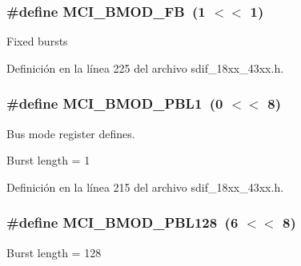 \subsubsection[{\texorpdfstring{M\+C\+I\+\_\+\+B\+M\+O\+D\+\_\+\+FB}{MCI_BMOD_FB}}]{\setlength{\rightskip}{0pt plus 5cm}\#define M\+C\+I\+\_\+\+B\+M\+O\+D\+\_\+\+FB~(1 $<$$<$ 1)}\hypertarget{group___s_d_i_f__18_x_x__43_x_x_ga86050ce8a0804c96d824fcc8d67ec905}{}\label{group___s_d_i_f__18_x_x__43_x_x_ga86050ce8a0804c96d824fcc8d67ec905}
Fixed bursts 

Definición en la línea 225 del archivo sdif\+\_\+18xx\+\_\+43xx.\+h.

\subsubsection[{\texorpdfstring{M\+C\+I\+\_\+\+B\+M\+O\+D\+\_\+\+P\+B\+L1}{MCI_BMOD_PBL1}}]{\setlength{\rightskip}{0pt plus 5cm}\#define M\+C\+I\+\_\+\+B\+M\+O\+D\+\_\+\+P\+B\+L1~(0 $<$$<$ 8)}\hypertarget{group___s_d_i_f__18_x_x__43_x_x_ga0813b6b5ee7658b090403123e5444a25}{}\label{group___s_d_i_f__18_x_x__43_x_x_ga0813b6b5ee7658b090403123e5444a25}


Bus mode register defines. 

Burst length = 1 

Definición en la línea 215 del archivo sdif\+\_\+18xx\+\_\+43xx.\+h.

\subsubsection[{\texorpdfstring{M\+C\+I\+\_\+\+B\+M\+O\+D\+\_\+\+P\+B\+L128}{MCI_BMOD_PBL128}}]{\setlength{\rightskip}{0pt plus 5cm}\#define M\+C\+I\+\_\+\+B\+M\+O\+D\+\_\+\+P\+B\+L128~(6 $<$$<$ 8)}\hypertarget{group___s_d_i_f__18_x_x__43_x_x_ga630a1184351b664e2423aaaa51abf676}{}\label{group___s_d_i_f__18_x_x__43_x_x_ga630a1184351b664e2423aaaa51abf676}
Burst length = 128 

